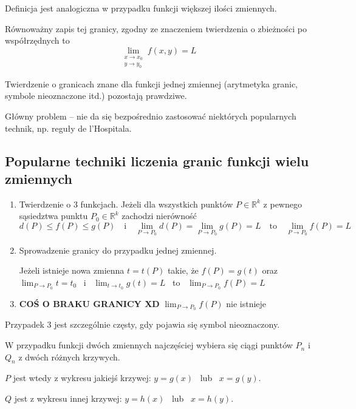 Definicja jest analogiczna w przypadku funkcji większej ilości zmiennych.

Równoważny zapis tej granicy, zgodny ze znaczeniem twierdzenia o zbieżności po współrzędnych to
$$ \lim_{\substack{x \to x_0 \\ y \to y_0}} f(x,y) = L $$

Twierdzenie o granicach znane dla funkcji jednej zmiennej (arytmetyka granic, symbole nieoznaczone itd.) pozostają prawdziwe.

Główny problem -- nie da się bezpośrednio zastosować niektórych popularnych technik, np. reguły de l'Hospitala.

\subsection*{Popularne techniki liczenia granic funkcji wielu zmiennych}

\begin{enumerate}
    \item Twierdzenie o 3 funkcjach. Jeżeli dla wszystkich punktów $ P \in \mathbb{R}^k $ z pewnego sąsiedztwa punktu
    $ P_0 \in \mathbb{R}^k $ zachodzi nierówność 
    $$ d(P) \leq f(P) \leq g(P) \quad \textrm{i} \quad \lim_{P \to P_0} d(P) = \lim_{P \to P_0} g(P) = L \quad \textrm{to} \quad \lim_{P \to P_0} f(P) = L $$

    \item Sprowadzenie granicy do przypadku jednej zmiennej.
    
    Jeżeli istnieje nowa zmienna $ t = t(P) $ takie, że $ f(P) = g(t) $ oraz 
    $ \lim_{P \to P_0} t = t_0 $ \ i \linebreak \ $ \lim_{t \to t_0} g(t) = L $ \ to \ $ \lim_{P \to P_0} f(P) = L $ 

    \item \textbf{COŚ O BRAKU GRANICY XD}
    $ \lim_{P \to P_0} f(P) $ nie istnieje
\end{enumerate}

Przypadek 3 jest szczególnie częsty, gdy pojawia się symbol nieoznaczony.

W przypadku funkcji dwóch zmiennych najczęściej wybiera się ciągi punktów $P_n$ i $Q_n$ z dwóch różnych krzywych.

$P$ jest wtedy z wykresu jakiejś krzywej: $ y=g(x)$ \ lub \ $x=g(y)$.

$Q$ jest z wykresu innej krzywej: $y=h(x)$ \ lub \ $x=h(y)$.

